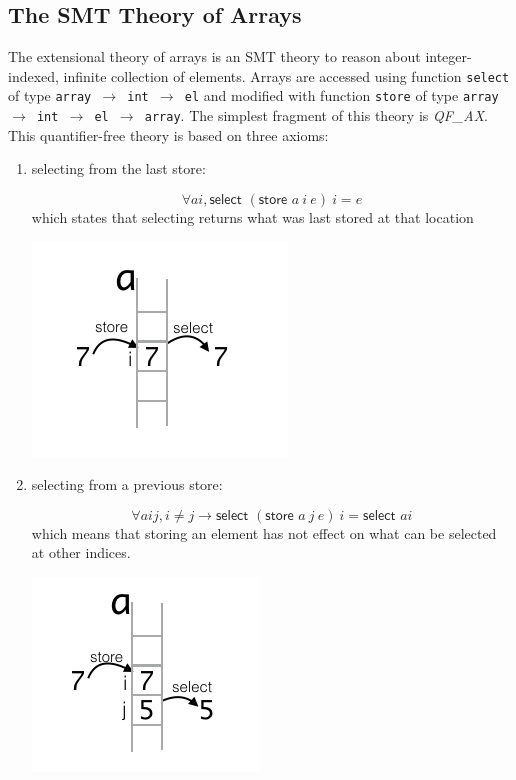 \documentclass[onecolumn, preprint]{sigplanconf}
\begin{document}
\subsection{The SMT Theory of Arrays}
The extensional theory of arrays is an SMT theory to reason about integer-indexed, infinite collection of elements. Arrays are accessed using function \texttt{select} of type \texttt{array $\rightarrow$ int $\rightarrow$ el} and modified with function \texttt{store} of type \texttt{array $\rightarrow$ int $\rightarrow$ el $\rightarrow$ array}. The simplest fragment of this theory is \emph{QF\_AX}. This quantifier-free theory is based on three axioms:
\begin{enumerate}
\item selecting from the last store:
  \begin{multicols}{2}
    
  $$ \forall a i, \textsf{select } (\textsf{store } a\ i\ e)\ i = e$$
which states that selecting returns what was last stored at that location
 
\includegraphics[scale=0.5]{pictures/axiom1.png}

  \end{multicols}
  
\item selecting from a previous store:
  \begin{multicols}{2}
  $$ \forall a i j, i \neq j \to \textsf{select } (\textsf{store } a\ j\ e)\ i = \textsf{select } a i$$
  which means that storing an element has not effect on what can be selected at other indices.

  \includegraphics[scale=0.5]{pictures/axiom2.png}
  \end{multicols}
  

\end{enumerate}
\end{document}
